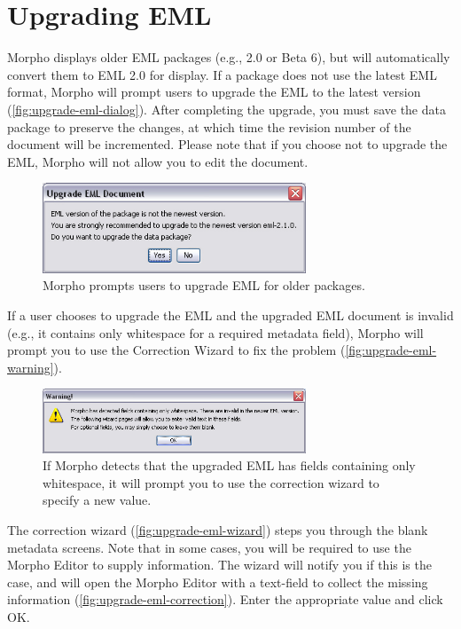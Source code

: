 \section{Upgrading EML} \label{sec:upgrading-eml}

Morpho displays older EML packages (e.g., 2.0 or Beta 6), but will
automatically convert them to EML 2.0 for display. If a package does not
use the latest EML format, Morpho will prompt users to upgrade the EML
to the latest version (\autoref{fig:upgrade-eml-dialog}). After
completing the upgrade, you must save the data package to preserve the
changes, at which time the revision number of the document will be
incremented. Please note that if you choose not to upgrade the EML,
Morpho will not allow you to edit the document.

\begin{figure}
  \centering
    \includegraphics[width=0.7\textwidth]{images/upgrade-eml-dialog.jpg}
  \caption{Morpho prompts users to upgrade EML for older packages.}
  \label{fig:upgrade-eml-dialog}
\end{figure}

If a user chooses to upgrade the EML and the upgraded EML document is
invalid (e.g., it contains only whitespace for a required metadata
field), Morpho will prompt you to use the Correction Wizard to fix the
problem (\autoref{fig:upgrade-eml-warning}).

\begin{figure}
  \centering
    \includegraphics[width=0.7\textwidth]{images/upgrade-eml-warning.jpg}
  \caption{If Morpho detects that the upgraded EML has fields containing
    only whitespace, it will prompt you to use the correction wizard to
    specify a new value.}
  \label{fig:upgrade-eml-warning}
\end{figure}

The correction wizard (\autoref{fig:upgrade-eml-wizard}) steps you
through the blank metadata screens. Note that in some cases, you will be
required to use the Morpho Editor to supply information. The wizard will
notify you if this is the case, and will open the Morpho Editor with a
text-field to collect the missing information
(\autoref{fig:upgrade-eml-correction}). Enter the appropriate value and
click OK.

